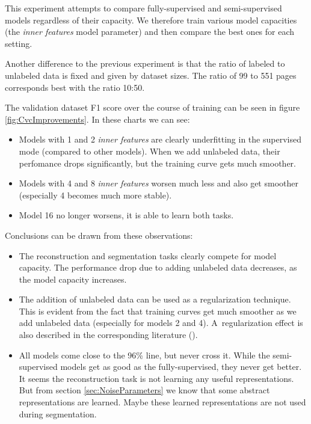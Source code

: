 This experiment attempts to compare fully-supervised and semi-supervised models regardless of their capacity. We therefore train various model capacities (the \emph{inner features} model parameter) and then compare the best ones for each setting.

Another difference to the previous experiment is that the ratio of labeled to unlabeled data is fixed and given by dataset sizes. The ratio of 99 to 551 pages corresponds best with the ratio 10:50.

The validation dataset F1 score over the course of training can be seen in figure \ref{fig:CvcImprovements}. In these charts we can see:

\begin{itemize}
    \item Models with 1 and 2 \emph{inner features} are clearly underfitting in the supervised mode (compared to other models). When we add unlabeled data, their perfomance drops significantly, but the training curve gets much smoother.
    \item Models with 4 and 8 \emph{inner features} worsen much less and also get smoother (especially 4 becomes much more stable).
    \item Model 16 no longer worsens, it is able to learn both tasks.
\end{itemize}

Conclusions can be drawn from these observations:

\begin{itemize}
    \item The reconstruction and segmentation tasks clearly compete for model capacity. The performance drop due to adding unlabeled data decreases, as the model capacity increases.
    \item The addition of unlabeled data can be used as a regularization technique. This is evident from the fact that training curves get much smoother as we add unlabeled data (especially for models 2 and 4). A~regularization effect is also described in the corresponding literature (\cite{SemisupervisedOverview}).
    \item All models come close to the 96\% line, but never cross it. While the semi-supervised models get as good as the fully-supervised, they never get better. It seems the reconstruction task is not learning any useful representations. But from section \ref{sec:NoiseParameters} we know that some abstract representations are learned. Maybe these learned representations are not used during segmentation.
\end{itemize}


